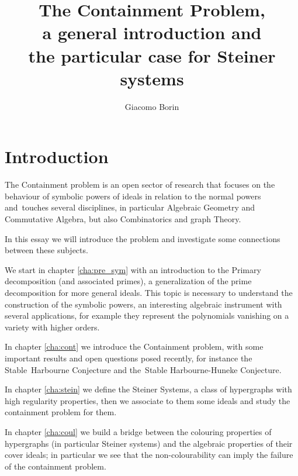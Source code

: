 \documentclass[notitlepage, a4]{book}
\title{The Containment Problem, 
\\a general introduction and 
\\the particular case for Steiner systems}
\author{Giacomo Borin}
\theoremstyle{plain}
\theoremstyle{remark}
\theoremstyle{definition}
\newcounter{que}
\begin{document}
\frontmatter

\pagestyle{fancy}
\fancyhf{}

\renewcommand{\headrulewidth}{1.5pt}
\renewcommand{\footrulewidth}{1.5pt}





\renewcommand{\headrulewidth}{1pt}
\renewcommand{\footrulewidth}{0pt}
\renewcommand{\chaptermark}[1]{\markboth{#1}{}}
\rhead{\leftmark}
\rfoot{\thepage}

\tableofcontents
\newpage
%
%

\section*{Introduction}
The Containment problem is an open sector of research that focuses on the behaviour of symbolic powers of ideals in relation to the normal powers and touches several disciplines, in particular Algebraic Geometry and Commutative Algebra, but also Combinatorics and graph Theory. 

In this essay we will introduce the problem and investigate some connections between these subjects. 

We start in chapter \ref{cha:pre_sym} with an introduction to the Primary decomposition (and associated primes), a generalization of the prime decomposition for more general ideals. This topic is necessary to understand the construction of the symbolic powers, an interesting algebraic instrument with several applications, for example they represent the polynomials vanishing on a variety with higher orders. 

In chapter \ref{cha:cont} we introduce the Containment problem, with some important results and open questions posed recently, for instance the Stable Harbourne Conjecture and the Stable Harbourne-Huneke Conjecture. 

In chapter \ref{cha:stein} we define the Steiner Systems, a class of hypergraphs with high regularity properties, then we associate to them some ideals and study the containment problem for them. 

In chapter \ref{cha:coul} we build a bridge between the colouring properties of hypergraphs (in particular Steiner systems) and the algebraic properties of their cover ideals; in particular we see that the non-colourability can imply the failure of the containment problem. 
\end{document}
